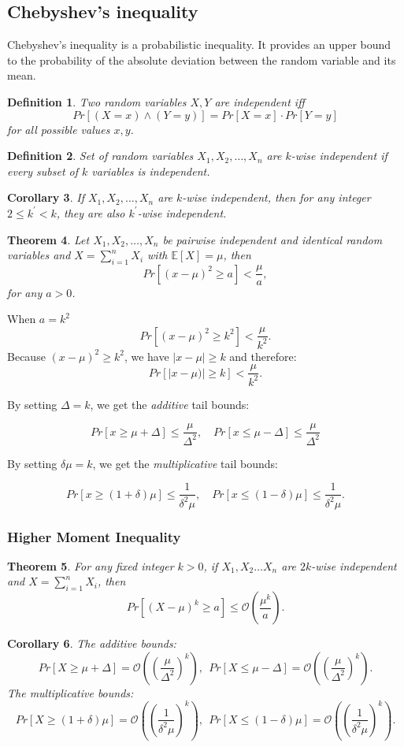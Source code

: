 \documentclass[11pt]{article}
\newtheorem{theorem}{Theorem}
\newtheorem{corollary}[theorem]{Corollary}
\newtheorem{definition}[theorem]{Definition}
\begin{document}
\subsection{Chebyshev's inequality}
Chebyshev's inequality is a probabilistic inequality. It provides an upper bound to the probability of the absolute deviation between the random variable and its mean.
\begin{definition}
Two random variables $X,Y$ are independent iff
\[
Pr[(X=x) \wedge (Y=y)]=Pr[X=x]\cdot Pr[Y=y]
\]
for all possible values $x,y$.
\end{definition}
\begin{definition}
Set of random variables $X_1,X_2,\ldots,X_n$ are $k$-wise independent if every subset of $k$ variables is independent.
\end{definition}
\begin{corollary}
If $X_1,X_2,\ldots,X_n$ are $k$-wise independent, then for any integer $2\le k^\prime <k$, they are also $k^\prime$-wise independent.
\end{corollary}
\begin{theorem}
Let $X_1,X_2,\ldots,X_n$ be pairwise independent and identical random variables and $X=\sum_{i=1}^n X_i$ with $\mathbb{E}[X]=\mu$, then
\[
Pr[(x-\mu)^2 \ge a]<\frac{\mu}{a},
\]
for any $a>0$.\
\end{theorem}
When $a=k^2$
\[
Pr[(x-\mu)^2 \ge k^2]<\frac{\mu}{k^2}.
\]
Because $(x-\mu)^2 \ge k^2$, we have $|x-\mu|\ge k$ and therefore:
\[
Pr[|x-\mu)| \ge k]<\frac{\mu}{k^2}.
\]

By setting $\Delta=k$, we get the {\em additive} tail bounds:

\[Pr[x\ge \mu+\Delta]\leq \frac{\mu}{\Delta^2}, \quad  Pr[x\leq \mu-\Delta]\le \frac{\mu}{\Delta^2}\]

By setting $\delta\mu=k$, we get the {\em multiplicative} tail bounds:

\[Pr[x\ge (1+\delta)\mu]\leq \frac{1}{\delta^2\mu}, \quad  Pr[x\leq (1-\delta)\mu]\leq \frac{1}{\delta^2\mu}.\]

\subsubsection{Higher Moment Inequality}
\begin{theorem}
For any fixed integer $k>0$, if $X_1,X_2\ldots X_n$ are $2k$-wise independent and $X=\sum_{i=1}^n X_i$, then
\[
Pr[(X-\mu)^k\ge a]\leq \mathcal{O} \left(\frac{\mu^k}{a}\right).
\]
\end{theorem}
\begin{corollary}
The additive bounds:
\[
Pr[X\ge \mu+\Delta]=\mathcal{O} \left(\left(\frac{\mu}{\Delta^2}\right)^k\right)
,\ \ Pr[X\leq \mu-\Delta]=\mathcal{O} \left(\left(\frac{\mu}{\Delta^2}\right)^k\right) .
\]
The multiplicative bounds:
\[
Pr[X\ge (1+\delta)\mu]=\mathcal{O} \left(\left(\frac{1}{\delta^2\mu}\right)^k\right) ,\ \ Pr[X\leq (1-\delta)\mu]=\mathcal{O} \left(\left(\frac{1}{\delta^2\mu}\right)^k\right).
\]
\end{corollary}
\end{document}
